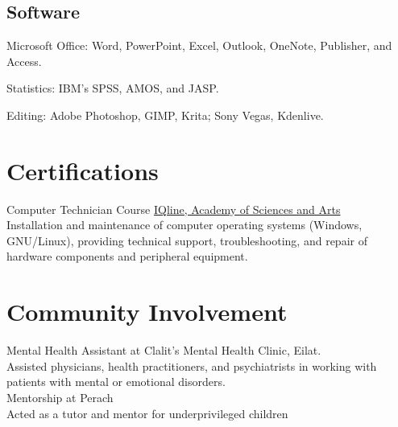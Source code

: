 \documentclass[]{rahulworld-resume}
\begin{document}
\begin{minipage}[t]{0.33\textwidth}
\subsection{Software}

Microsoft Office: Word, PowerPoint, Excel, Outlook, OneNote, Publisher, and Access. 

Statistics: IBM's SPSS, AMOS, and JASP. 

Editing: Adobe Photoshop, GIMP, Krita; Sony Vegas, Kdenlive. 
\sectionsep
\section{Certifications}
Computer Technician Course
\href{https://loona-il.000webhostapp.com/resume-references/computer-technitian-certificate.jpg}{IQline, Academy of Sciences and Arts}\\

Installation and maintenance of computer operating systems (Windows, GNU/Linux), providing technical support, troubleshooting, and repair of hardware components and peripheral equipment.

\sectionsep
\section{Community Involvement}
Mental Health Assistant at Clalit's Mental Health Clinic, Eilat. \\
Assisted physicians, health practitioners, and psychiatrists in working with patients with mental or emotional disorders. \\
Mentorship at Perach \\
Acted as a tutor and mentor for underprivileged children
\sectionsep

\end{minipage}
\end{document}
